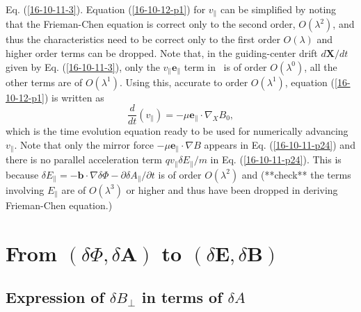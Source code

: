 \documentclass{llncs}
\begin{document}
Eq. (\ref{16-10-11-3}). Equation (\ref{16-10-12-p1}) for $v_{\parallel}$ can
be simplified by noting that the Frieman-Chen equation is correct only to the
second order, $O (\lambda^2)$, and thus the characteristics need to be correct
only to the first order $O (\lambda)$ and higher order terms can be dropped.
Note that, in the guiding-center drift $d\mathbf{X}/ d t$ given by Eq.
(\ref{16-10-11-3}), only the $v_{\parallel} \mathbf{e}_{\parallel}$ term in \
is of order $O (\lambda^0)$, all the other terms are of $O (\lambda^1)$. Using
this, accurate to order $O (\lambda^1)$, equation (\ref{16-10-12-p1}) is
written as
\begin{equation}
  \label{16-10-11-p24} \frac{d}{d t} (v_{\parallel}) = - \mu
  \mathbf{e}_{\parallel} \cdot \nabla_X B_0,
\end{equation}
which is the time evolution equation ready to be used for numerically
advancing $v_{\parallel}$. Note that only the mirror force $- \mu
\mathbf{e}_{\parallel} \cdot \nabla B$ appears in Eq. (\ref{16-10-11-p24}) and
there is no parallel acceleration term $q v_{\parallel} \delta E_{\parallel} /
m$ in Eq. (\ref{16-10-11-p24}). This is because $\delta E_{\parallel} =
-\mathbf{b} \cdot \nabla \delta \Phi - \partial \delta A_{\parallel} /
\partial t$ is of order $O (\lambda^2)$ and (**check** the terms involving
$E_{\parallel}$ are of $O (\lambda^3)$ or higher and thus have been dropped in
deriving Frieman-Chen equation.)

\section{From $(\delta \Phi, \delta \mathbf{A})$ to $(\delta \mathbf{E},
\delta \mathbf{B})$}

\subsection{Expression of $\delta B_{\perp}$ in terms of $\delta A$}
\end{document}
